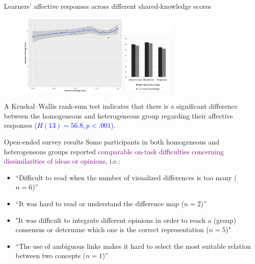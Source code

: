 \begin{frame}{Learners' affective responses across  different  shared-knowledge scores}
    \begin{figure}[tb]
     \begin{center}
      \includegraphics[width=80mm]{images/rqb_affective-response-redraw.pdf}
      \end{center}
      \label{rqb::affective}  
    \end{figure}
    
    A Kruskal–Wallis rank-sum test indicates that there is a significant difference between the homogeneous and heterogeneous group regarding their affective responses \textcolor{blue}{($H(13) = 56.8, p < .001$)}. 

\end{frame}

\begin{frame}{Open-ended survey results}
Some participants in both homogeneous and
heterogeneous groups reported \textcolor{purple}{comparable on-task 
difficulties concerning dissimilarities of ideas or 
opinions}, i.e.:
{\small
\begin{itemize}
    \item “Difficult to read when the number of visualized differences is too many ($n = 6$)”
    \item “It was hard to read or understand the difference map ($n = 2$)”
    \item "It was difficult to integrate different opinions in order to reach a (group) consensus or determine which one is the correct representation ($n = 5$)"
    \item “The use of ambiguous links makes it hard to select the most suitable relation between two concepts ($n = 1$)”
\end{itemize} 
}
\end{frame}

